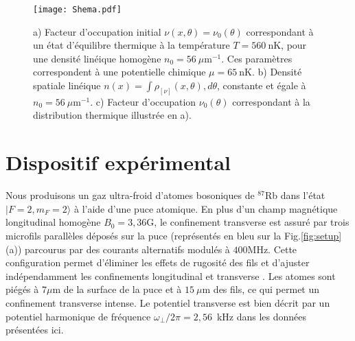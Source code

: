 \begin{figure}[!htb]
	\centering
	\texttt{[image: Shema.pdf]}	
	\caption{a) Facteur d’occupation initial $\nu(x, \theta) = \nu_0(\theta)$ correspondant à un état d’équilibre thermique à la température $T = 560~\mathrm{nK}$, pour une densité linéique homogène $n_0 = 56~\mu\mathrm{m}^{-1}$. Ces paramètres correspondent à une potentielle chimique $\mu = 65~\mathrm{nK}$.
b) Densité spatiale linéique $n(x) = \int \rho_{[\nu]}(x, \theta), d\theta$, constante et égale à $n_0 = 56~\mu\mathrm{m}^{-1}$.
c) Facteur d’occupation $\nu_0(\theta)$ correspondant à la distribution thermique illustrée en a).}
	\label{fig:BiPart.insitut}
\end{figure}


\section{Dispositif expérimental}




Nous produisons un gaz ultra-froid d’atomes bosoniques de $^{87}$Rb dans l’état $|F=2,m_F=2\rangle$ à l’aide d’une puce atomique. En plus d’un champ magnétique longitudinal homogène $B_0 = 3{,}36$G, le confinement transverse est assuré par trois microfils parallèles déposés sur la puce (représentés en bleu sur la Fig.\ref{fig:setup}(a)) parcourus par des courants alternatifs modulés à $400$MHz. Cette configuration permet d’éliminer les effets de rugosité des fils et d’ajuster indépendamment les confinements longitudinal et transverse \cite{PhysRevLett.98.263201}. Les atomes sont piégés à $7\mu$m de la surface de la puce et à $15~\mu$m des fils, ce qui permet un confinement transverse intense. Le potentiel transverse est bien décrit par un potentiel harmonique de fréquence $\omega_{\perp}/2\pi = 2{,}56$~kHz dans les données présentées ici.

